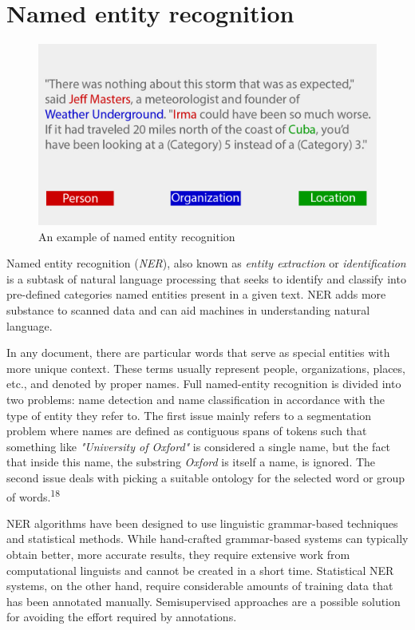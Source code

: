 \documentclass{report}
\begin{document}
\section{Named entity recognition}
\begin{figure}[b]
\centerline{\includegraphics[scale=0.45]{ner}}
\caption{An example of named entity recognition}
\end{figure}
Named entity recognition (\textit{NER}), also known as \textit{entity extraction} or \textit{identification} is a subtask of natural language processing that seeks to identify and classify into pre-defined categories named entities present in a given text. NER adds more substance to scanned data and can aid machines in understanding natural language. \par

In any document, there are particular words that serve as special entities with more unique context. These terms usually represent people, organizations, places, etc., and denoted by proper names. Full named-entity recognition is divided into two problems: name detection and name classification in accordance with the type of entity they refer to. The first issue mainly refers to a segmentation problem where names are defined as contiguous spans of tokens such that something like \textit{"University of Oxford"} is considered a single name, but the fact that inside this name, the substring \textit{Oxford} is itself a name, is ignored. The second issue deals with picking a suitable ontology for the selected word or group of words.\textsuperscript{18} \par

NER algorithms have been designed to use linguistic grammar-based techniques and statistical methods. While hand-crafted grammar-based systems can typically obtain better, more accurate results, they require extensive work from computational linguists and cannot be created in a short time. Statistical NER systems, on the other hand, require considerable amounts of training data that has been annotated manually. Semisupervised approaches are a possible solution for avoiding the effort required by annotations. \par
\end{document}

